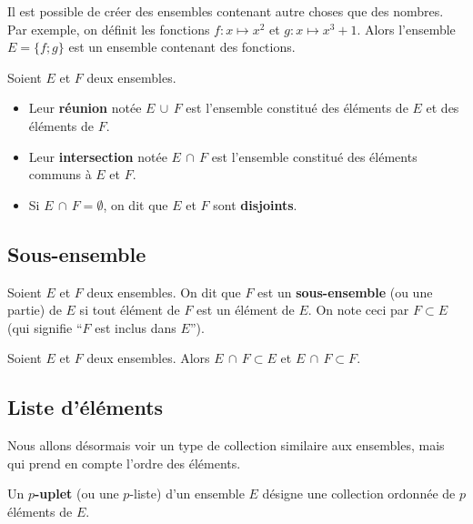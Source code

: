 	\begin{tip}
		Il est possible de créer des ensembles contenant autre choses que des nombres. Par exemple, on définit les fonctions $f : x \mapsto x^2$ et $g : x \mapsto x^3 + 1$. Alors l'ensemble $E = \{f; g\}$ est un ensemble contenant des fonctions.
	\end{tip}
	
	\begin{formula}
		Soient $E$ et $F$ deux ensembles.
		\begin{itemize}
			\item Leur \textbf{réunion} notée $E \, \cup \, F$ est l'ensemble constitué des éléments de $E$ et des éléments de $F$.
			\item Leur \textbf{intersection} notée $E \, \cap \, F$ est l'ensemble constitué des éléments communs à $E$ et $F$.
			\item Si $E \, \cap \, F = \emptyset$, on dit que $E$ et $F$ sont \textbf{disjoints}.
		\end{itemize}
	\end{formula}
	
	\subsection{Sous-ensemble}
	
	\begin{formula}[Définition]
		Soient $E$ et $F$ deux ensembles. On dit que $F$ est un \textbf{sous-ensemble} (ou une partie) de $E$ si tout élément de $F$ est un élément de $E$.
		\newpar
		On note ceci par $F \subset E$ (qui signifie ``$F$ est inclus dans $E$'').
	\end{formula}
	
	
	\begin{tip}[Exemple]
		Soient $E$ et $F$ deux ensembles. Alors $E \, \cap \, F \subset E$ et $E \, \cap \, F \subset F$.
	\end{tip}
	
	\subsection{Liste d'éléments}
	
	Nous allons désormais voir un type de collection similaire aux ensembles, mais qui prend en compte l'ordre des éléments.
	
	\begin{formula}[Définition]
		Un \textbf{$p$-uplet} (ou une $p$-liste) d'un ensemble $E$ désigne une collection ordonnée de $p$ éléments de $E$.
	\end{formula}
	
